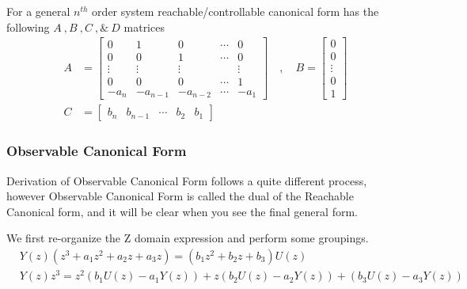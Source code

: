 \documentclass[twoside]{article}
\begin{document}
For a general $n^{th}$ order system reachable/controllable
canonical form has the following $A \ ,  B \ ,  C \ , \& \ D$
matrices
%
\begin{align*}
A &= \left[ \begin{array}{ccccc} 0 & 1 & 0 & \cdots & 0 \\ 0 & 0 & 1 &
                                                                      \cdots & 0
\\ \vdots & \vdots & \vdots & & \vdots
\\ 0 & 0 & 0 & \cdots & 1
    \\ -a_n & -a_{n-1} & -a_{n-2} & \cdots & -a_1 \end{array} \right]
\quad , \quad 
B = \left[ \begin{array}{c} 0\\ 0 \\ \vdots \\ 0
    \\ 1 \end{array} \right]
\\ C &= \left[ \begin{array}{ccccc} b_n 
  &  b_{n-1} & \cdots &  b_2 &
   b_1 \end{array} \right]
\end{align*}

\subsubsection*{Observable Canonical Form}

Derivation of Observable Canonical Form follows a quite
different process, however Observable Canonical Form is called the
dual of the Reachable Canonical form, and it will be clear when you 
see the final general form. 

We first re-organize the Z domain expression and perform some
groupings. 
%
\begin{align*}
&Y(z) \left( z^3+ a_1 z^2 + a_2 z + a_3 z \right) = \left( b_1 z^2 + b_2 z + b_3 \right) U(z)
\\
&Y(z) z^3 = z^2 \left( b_1 U(z) - a_1 Y(z) \right) 
+  z \left( b_2 U(z) - a_2 Y(z) \right) +  \left( b_3 U(z) - a_3 Y(z) \right) 
\end{align*}
\end{document}
